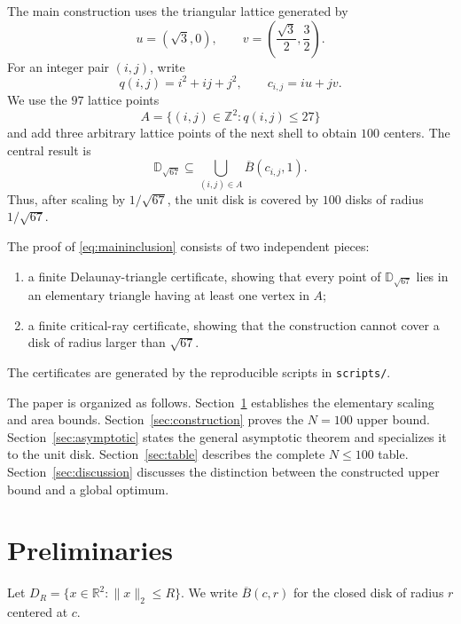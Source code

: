\documentclass[11pt]{article}
\theoremstyle{definition}
\newcommand{\R}{\mathbb{R}}
\newcommand{\Z}{\mathbb{Z}}
\newcommand{\D}{\mathbb{D}}
\begin{document}
The main construction uses the triangular lattice generated by
\begin{equation}
  u=(\sqrt3,0),\qquad
  v=\left(\frac{\sqrt3}{2},\frac32\right).
  \label{eq:basis}
\end{equation}
For an integer pair $(i,j)$, write
\begin{equation}
  q(i,j)=i^2+ij+j^2,
  \qquad
  c_{i,j}=iu+jv.
  \label{eq:centers}
\end{equation}
We use the $97$ lattice points
\begin{equation}
  A=\{(i,j)\in\Z^2:q(i,j)\le27\}
  \label{eq:A}
\end{equation}
and add three arbitrary lattice points of the next shell to obtain
$100$ centers.  The central result is
\begin{equation}
  \D_{\sqrt{67}}\subseteq
  \bigcup_{(i,j)\in A}\overline B(c_{i,j},1).
  \label{eq:maininclusion}
\end{equation}
Thus, after scaling by $1/\sqrt{67}$, the unit disk is covered by $100$
disks of radius $1/\sqrt{67}$.

The proof of \eqref{eq:maininclusion} consists of two independent
pieces:
\begin{enumerate}[label=(\roman*)]
  \item a finite Delaunay-triangle certificate, showing that every point
        of $\D_{\sqrt{67}}$ lies in an elementary triangle having at
        least one vertex in $A$;
  \item a finite critical-ray certificate, showing that the construction
        cannot cover a disk of radius larger than $\sqrt{67}$.
\end{enumerate}
The certificates are generated by the reproducible scripts in
\texttt{scripts/}.

The paper is organized as follows.  Section~\ref{sec:prelim} establishes
the elementary scaling and area bounds.  Section~\ref{sec:construction}
proves the $N=100$ upper bound.  Section~\ref{sec:asymptotic} states the
general asymptotic theorem and specializes it to the unit disk.
Section~\ref{sec:table} describes the complete $N\le100$ table.
Section~\ref{sec:discussion} discusses the distinction between the
constructed upper bound and a global optimum.

\section{Preliminaries}
\label{sec:prelim}

Let $D_R=\{x\in\R^2:\|x\|_2\le R\}$.  We write
$\overline B(c,r)$ for the closed disk of radius $r$ centered at $c$.
\end{document}
